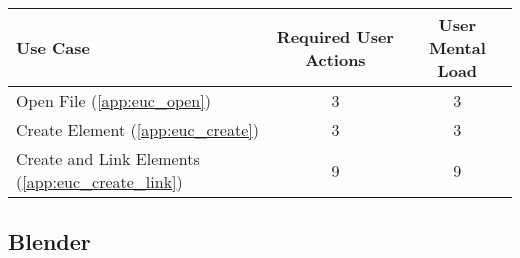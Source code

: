 

\begin{tabularx}{\textwidth}{Xcc}
\textbf{Use Case} & \textbf{Required User Actions} & \textbf{User Mental Load}\\
\hline
Open File (\ref{app:euc_open})                       & 3 & 3 \\
Create Element (\ref{app:euc_create})                & 3 & 3 \\
Create and Link Elements (\ref{app:euc_create_link}) & 9 & 9
\end{tabularx}

\subsection*{Blender}




